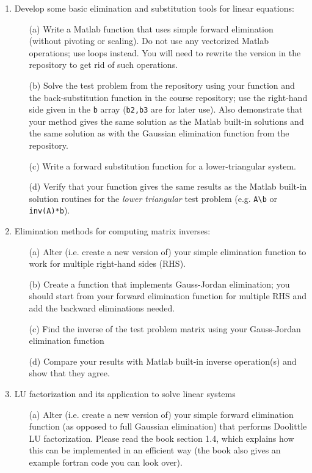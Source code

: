 \documentclass{article}
\begin{document}
\pagebreak

\begin{enumerate}
  \item Develop some basic elimination and substitution tools for linear equations:   
  \begin{itemize}
    \item[(a)] Write a Matlab function that uses simple forward elimination (without pivoting or scaling).  Do not use any vectorized Matlab operations; use loops instead.  You will need to rewrite the version in the repository to get rid of such operations.  
    \item[(b)] Solve the test problem from the repository using your function and the back-substitution function in the course repository; use the right-hand side given in the \texttt{b} array (\texttt{b2,b3} are for later use).   Also demonstrate that your method gives the same solution as the Matlab built-in solutions and the same solution as with the Gaussian elimination function from the repository. 
    \item[(c)] Write a forward substitution function for a lower-triangular system.  
    \item[(d)] Verify that your function gives the same results as the Matlab built-in solution routines for the \emph{lower triangular} test problem (e.g. \texttt{A\textbackslash b} or \texttt{inv(A)*b}).  
  \end{itemize}
  \item Elimination methods for computing matrix inverses:  
  \begin{itemize}
    \item[(a)] Alter (i.e. create a new version of) your simple elimination function to work for multiple right-hand sides (RHS).  
    \item[(b)] Create a function that implements Gauss-Jordan elimination; you should start from your forward elimination function for multiple RHS and add the backward eliminations needed.  
    \item[(c)] Find the inverse of the test problem matrix using your Gauss-Jordan elimination function
    \item[(d)] Compare your results with Matlab built-in inverse operation(s) and show that they agree.
  \end{itemize}
  \item LU factorization and its application to solve linear systems
  \begin{itemize}
    \item[(a)] Alter (i.e. create a new version of) your simple forward elimination function (as opposed to full Gaussian elimination) that performs Doolittle LU factorization.  Please read the book section 1.4, which explains how this can be implemented in an efficient way (the book also gives an example fortran code you can look over).  

\end{itemize}
\end{enumerate}
\end{document}
